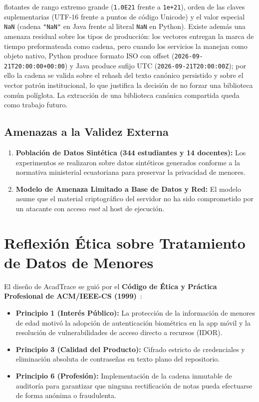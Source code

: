 \documentclass[11pt,a4paper]{article}
\begin{document}
\begin{enumerate}
flotantes de rango extremo grande (\texttt{1.0E21} frente a
\texttt{1e+21}), orden de las claves suplementarias (UTF-16 frente a
puntos de c\'odigo Unicode) y el valor especial \texttt{NaN} (cadena
\texttt{"NaN"} en Java frente al literal \texttt{NaN} en Python). Existe
adem\'as una amenaza residual sobre los tipos de producci\'on: los
vectores entregan la marca de tiempo preformateada como cadena, pero
cuando los servicios la manejan como objeto nativo, Python produce
formato ISO con offset (\texttt{2026-09-21T20:00:00+00:00}) y Java
produce sufijo UTC (\texttt{2026-09-21T20:00:00Z}); por ello la cadena
se valida sobre el rehash del texto can\'onico persistido y sobre el
vector patr\'on institucional, lo que justifica la decisi\'on de no
forzar una biblioteca com\'un pol\'iglota. La extracci\'on de una
biblioteca can\'onica compartida queda como trabajo futuro.
\end{enumerate}

\subsection{Amenazas a la Validez Externa}
\begin{enumerate}
  \item \textbf{Poblaci\'on de Datos Sint\'etica (344 estudiantes y 14 docentes):} Los experimentos se realizaron sobre datos sint\'eticos generados conforme a la normativa ministerial ecuatoriana para preservar la privacidad de menores.
  \item \textbf{Modelo de Amenaza Limitado a Base de Datos y Red:} El modelo asume que el material criptogr\'afico del servidor no ha sido comprometido por un atacante con acceso \textit{root} al host de ejecuci\'on.
\end{enumerate}

\section{Reflexi\'on \'Etica sobre Tratamiento de Datos de Menores}
\label{sec:reflexion-etica}
El dise\~no de AcadTrace se gui\'o por el \textbf{C\'odigo de \'Etica y Pr\'actica Profesional de ACM/IEEE-CS (1999)}~\cite{acmieee1999code}:
\begin{itemize}[leftmargin=*]
  \item \textbf{Principio 1 (Inter\'es P\'ublico):} La protecci\'on de la informaci\'on de menores de edad motiv\'o la adopci\'on de autenticaci\'on biom\'etrica en la app m\'ovil y la resoluci\'on de vulnerabilidades de acceso directo a recursos (IDOR).
  \item \textbf{Principio 3 (Calidad del Producto):} Cifrado estricto de credenciales y eliminaci\'on absoluta de contrase\~nas en texto plano del repositorio.
  \item \textbf{Principio 6 (Profesi\'on):} Implementaci\'on de la cadena inmutable de auditor\'ia para garantizar que ninguna rectificaci\'on de notas pueda efectuarse de forma an\'onima o fraudulenta.
\end{itemize}
\end{document}
